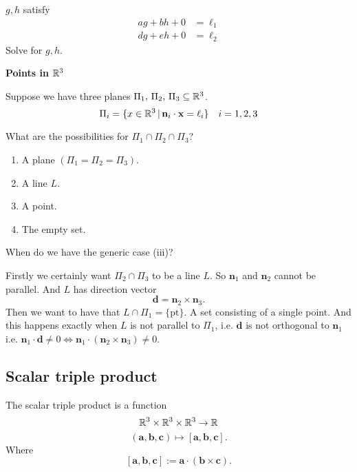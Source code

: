 \documentclass[10pt, a4paper]{article}
\newcommand{\mbf}[1]{\mathbf{#1}}
\begin{document}
$g, h$ satisfy
\begin{align*}
    ag + bh + 0 &= \ell_1 \\
    dg + eh + 0 &= \ell_2
\end{align*}
Solve for $g, h$.

\textbf{Points in} $\mathbb{R} ^ 3$

Suppose we have three planes
$\Pi_1,\,\Pi_2,\,\Pi_3 \subseteq \mathbb{R} ^ 3$.
\[
\Pi_i = \{x \in \R ^ 3 \, | \, \mbf{n}_i \cdot \mbf{x} = \ell_i\}\quad i = 1, 2, 3
\]

What are the possibilities for $\Pi_1 \cap \Pi_2 \cap \Pi_3$?
\begin{enumerate}[label = (\roman*)]
    \item A plane $(\Pi_1 = \Pi_2 = \Pi_3)$.
    \item A line $L$.
    \item A point.
    \item The empty set.
\end{enumerate}

When do we have the generic case (iii)?

Firstly we certainly want $\Pi_2 \cap \Pi_3$ to be a line $L$. So $\mbf{n}_1$ and $\mbf{n}_2$ cannot be parallel. And $L$ has direction vector
\[
\mbf{d} = \mbf{n}_2 \times \mbf{n}_3.
\]
Then we want to have that $L \cap \Pi_1 = \{\text{pt}\}.$ A set consisting of a single point. And this happens exactly when $L$ is not parallel to $\Pi_1$, i.e. $\mbf{d}$ is not orthogonal to $\mbf{n}_1$ i.e. $\mbf{n}_1 \cdot \mbf{d} \neq 0 \iff \mbf{n}_1 \cdot (\mbf{n}_2 \times \mbf{n}_3) \neq 0$.

\subsection{Scalar triple product}

\begin{definition}
    The scalar triple product is a function
    \[
    \mathbb{R} ^ 3 \times \mathbb{R} ^ 3 \times \mathbb{R} ^ 3 \rightarrow \mathbb{R}
    \]
    \[
    (\mbf{a}, \mbf{b}, \mbf{c}) \mapsto [\mbf{a}, \mbf{b}, \mbf{c}].
    \]
    Where
    \[
    [\mbf{a}, \mbf{b}, \mbf{c}] := \mbf{a} \cdot (\mbf{b} \times \mbf{c}).
    \]
\end{definition}
\end{document}
